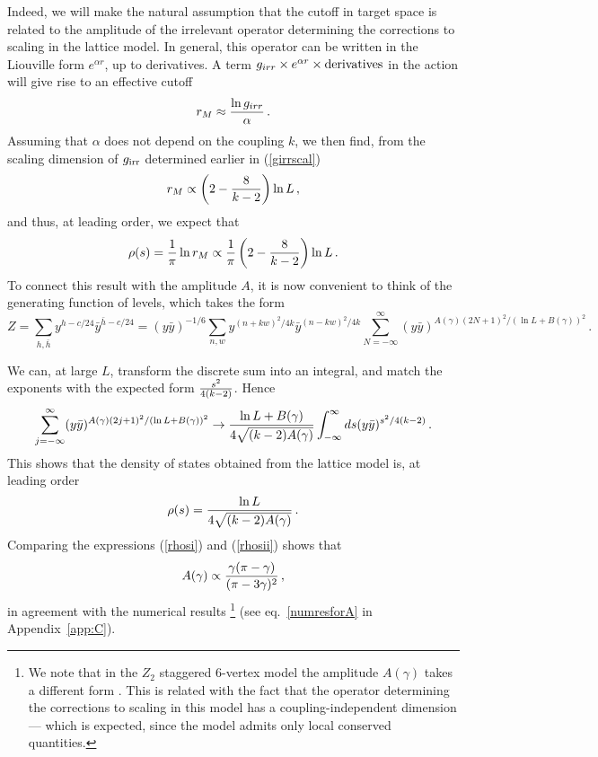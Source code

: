 \documentclass[11pt]{article}
\begin{document}
Indeed, we will make the natural assumption that the cutoff in target space is  related to the amplitude of the irrelevant operator determining the corrections to scaling in the lattice model. In general, this operator can be written in the Liouville form $e^{\alpha r}$, up to derivatives. A term  $g_{irr}\times e^{\alpha r}\times \hbox{derivatives}$  in the action will give rise to an effective cutoff 
%
\begin{equation}
r_M\approx {\ln g_{irr}\over\alpha} \,.
\end{equation}
%
Assuming that $\alpha$ does not depend on the coupling $k$, we then find, from the scaling dimension of $g_{\rm irr}$ determined earlier in (\ref{girrscal})
%
\begin{equation}
r_M\propto \left(2-{8\over k-2}\right)\ln L \,,
\end{equation}
%
and thus, at leading order, we expect that 
%
\begin{equation}
\rho(s)={1\over\pi}\ln r_M\propto {1\over\pi}\left(2-{8\over k-2}\right)\ln L\label{rhosi} \,.
\end{equation}
%
To connect this result with the amplitude $A$, it is now convenient to think of the generating function of levels, which takes the form
%
\begin{equation}
Z=\sum_{h,\bar{h}} y^{h-c/24}\bar{y}^{\bar{h}-c/24}=\left(y\bar{y}\right)^{-1/6} \sum_{n,w} y^{(n+kw)^2/4k}\bar{y}^{(n-kw)^2/4k}\sum_{N=-\infty}^\infty (y\bar{y})^{A(\gamma) (2N+1)^2/(\ln L+B(\gamma))^2} \,.
\end{equation}
%

We can, at large $L$, transform the discrete sum into an integral, and match the exponents with the expected form ${s^2\over 4(k-2)}$. Hence 
%
\begin{equation}
\sum_{j=-\infty}^\infty (y\bar{y})^{A(\gamma) (2j+1)^2/(\ln L+B(\gamma))^2}\rightarrow
{\ln L+B(\gamma)\over 4\sqrt{(k-2) A(\gamma)}}\int_{-\infty}^\infty ds (y\bar{y})^{s^2/4(k-2)} \,.
\end{equation}
%
This shows that the density of states obtained from the lattice model is, at leading order
%
\begin{equation}
\rho(s)={\ln L\over 4\sqrt{(k-2)A(\gamma)}}\label{rhosii} \,.
\end{equation}
%
Comparing the expressions (\ref{rhosi}) and (\ref{rhosii}) shows that
%
\begin{equation}
A(\gamma)\propto {\gamma(\pi-\gamma)\over (\pi-3\gamma)^2} \,,
\end{equation}
%
in agreement with the numerical results%
\footnote{We note that in the $Z_2$ staggered 6-vertex model the amplitude $A(\gamma)$ takes a different form \cite{IkhlefJS3,CanduIkhlef}. This is related with the fact that the operator determining the corrections to scaling in this model has a coupling-independent dimension --- which is expected, since the model admits only local conserved quantities.}
%
(see eq.~\ref{numresforA} in Appendix~\ref{app:C}).
\end{document}
